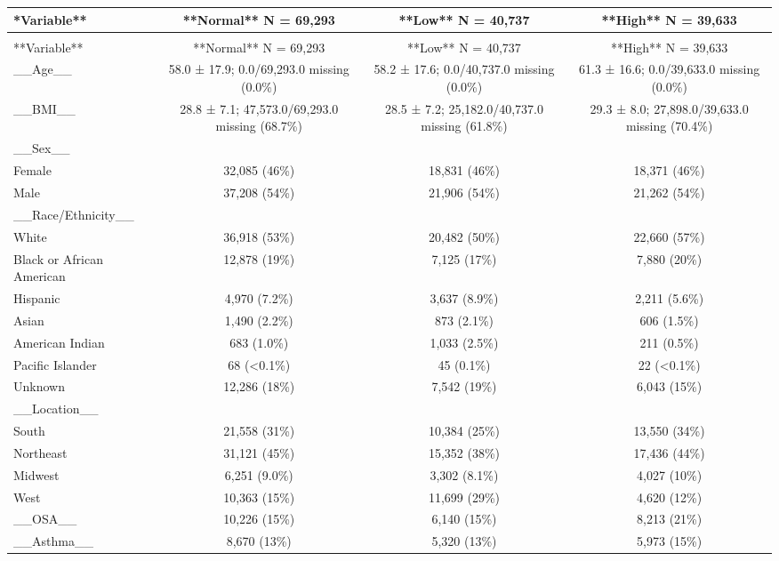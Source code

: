 \documentclass[
  11pt,
  letterpaper,
  DIV=11,
  numbers=noendperiod]{scrartcl}
\begin{document}
\begin{longtable*}{>{\raggedright\arraybackslash}p{2.0in}ccc}
\toprule
**Variable** & **Normal**  N = 69,293 & **Low**  N = 40,737 & **High**  N = 39,633\\
\midrule
\endfirsthead
{}\\
\toprule
**Variable** & **Normal**  N = 69,293 & **Low**  N = 40,737 & **High**  N = 39,633\\
\midrule
\endhead

\endfoot
\bottomrule
\endlastfoot
\_\_Age\_\_ & 58.0 ± 17.9; 0.0/69,293.0 missing (0.0\%) & 58.2 ± 17.6; 0.0/40,737.0 missing (0.0\%) & 61.3 ± 16.6; 0.0/39,633.0 missing (0.0\%)\\
\_\_BMI\_\_ & 28.8 ± 7.1; 47,573.0/69,293.0 missing (68.7\%) & 28.5 ± 7.2; 25,182.0/40,737.0 missing (61.8\%) & 29.3 ± 8.0; 27,898.0/39,633.0 missing (70.4\%)\\
\_\_Sex\_\_ &  &  & \\
Female & 32,085 (46\%) & 18,831 (46\%) & 18,371 (46\%)\\
Male & 37,208 (54\%) & 21,906 (54\%) & 21,262 (54\%)\\
\addlinespace
\_\_Race/Ethnicity\_\_ &  &  & \\
White & 36,918 (53\%) & 20,482 (50\%) & 22,660 (57\%)\\
Black or African American & 12,878 (19\%) & 7,125 (17\%) & 7,880 (20\%)\\
Hispanic & 4,970 (7.2\%) & 3,637 (8.9\%) & 2,211 (5.6\%)\\
Asian & 1,490 (2.2\%) & 873 (2.1\%) & 606 (1.5\%)\\
\addlinespace
American Indian & 683 (1.0\%) & 1,033 (2.5\%) & 211 (0.5\%)\\
Pacific Islander & 68 (<0.1\%) & 45 (0.1\%) & 22 (<0.1\%)\\
Unknown & 12,286 (18\%) & 7,542 (19\%) & 6,043 (15\%)\\
\_\_Location\_\_ &  &  & \\
South & 21,558 (31\%) & 10,384 (25\%) & 13,550 (34\%)\\
\addlinespace
Northeast & 31,121 (45\%) & 15,352 (38\%) & 17,436 (44\%)\\
Midwest & 6,251 (9.0\%) & 3,302 (8.1\%) & 4,027 (10\%)\\
West & 10,363 (15\%) & 11,699 (29\%) & 4,620 (12\%)\\
\_\_OSA\_\_ & 10,226 (15\%) & 6,140 (15\%) & 8,213 (21\%)\\
\_\_Asthma\_\_ & 8,670 (13\%) & 5,320 (13\%) & 5,973 (15\%)\\

\end{longtable*}
\end{document}
